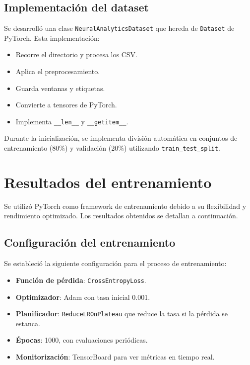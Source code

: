 \subsection{Implementación del dataset}

Se desarrolló una clase \texttt{NeuralAnalyticsDataset} que hereda de \texttt{Dataset} de PyTorch. Esta implementación:

\begin{itemize}
    \item Recorre el directorio y procesa los CSV.
    \item Aplica el preprocesamiento.
    \item Guarda ventanas y etiquetas.
    \item Convierte a tensores de PyTorch.
    \item Implementa \texttt{\_\_len\_\_} y \texttt{\_\_getitem\_\_}.
\end{itemize}

Durante la inicialización, se implementa división automática en conjuntos de entrenamiento (80\%) y validación (20\%) utilizando \texttt{train\_test\_split}.

\section{Resultados del entrenamiento}

Se utilizó PyTorch como framework de entrenamiento debido a su flexibilidad y rendimiento optimizado. Los resultados obtenidos se detallan a continuación.

\subsection{Configuración del entrenamiento}

Se estableció la siguiente configuración para el proceso de entrenamiento:

\begin{itemize}
    \item \textbf{Función de pérdida}: \texttt{CrossEntropyLoss}.
    
    \item \textbf{Optimizador}: Adam con tasa inicial 0.001.
    
    \item \textbf{Planificador}: \texttt{ReduceLROnPlateau} que reduce la tasa si la pérdida se estanca.
    
    \item \textbf{Épocas}: 1000, con evaluaciones periódicas.
    
    \item \textbf{Monitorización}: TensorBoard para ver métricas en tiempo real.
\end{itemize}

